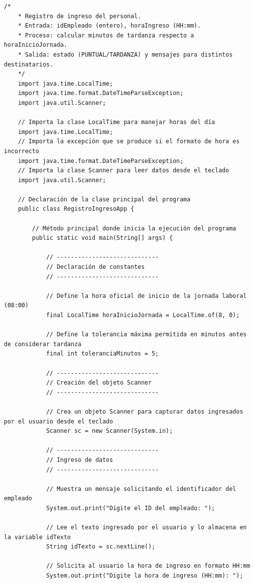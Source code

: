 \documentclass[12pt,twoside]{book}
\begin{document}
					\begin{lstlisting}[style=Java,caption={Programa Java mínimo para registrar ingreso del personal (entrada por teclado).},label={lst:RegistroIngresoJavaMin}]
	/*
	* Registro de ingreso del personal.
	* Entrada: idEmpleado (entero), horaIngreso (HH:mm).
	* Proceso: calcular minutos de tardanza respecto a horaInicioJornada.
	* Salida: estado (PUNTUAL/TARDANZA) y mensajes para distintos destinatarios.
	*/
	import java.time.LocalTime;
	import java.time.format.DateTimeParseException;
	import java.util.Scanner;
	
	// Importa la clase LocalTime para manejar horas del día
	import java.time.LocalTime;
	// Importa la excepción que se produce si el formato de hora es incorrecto
	import java.time.format.DateTimeParseException; 
	// Importa la clase Scanner para leer datos desde el teclado
	import java.util.Scanner;                       
	
	// Declaración de la clase principal del programa
	public class RegistroIngresoApp {               
		
		// Método principal donde inicia la ejecución del programa
		public static void main(String[] args) {    
			
			// -----------------------------
			// Declaración de constantes
			// -----------------------------
			
			// Define la hora oficial de inicio de la jornada laboral (08:00)
			final LocalTime horaInicioJornada = LocalTime.of(8, 0); 
			
			// Define la tolerancia máxima permitida en minutos antes de considerar tardanza
			final int toleranciaMinutos = 5;
			
			// -----------------------------
			// Creación del objeto Scanner
			// -----------------------------
			
			// Crea un objeto Scanner para capturar datos ingresados por el usuario desde el teclado
			Scanner sc = new Scanner(System.in); 
			
			// -----------------------------
			// Ingreso de datos
			// -----------------------------
			
			// Muestra un mensaje solicitando el identificador del empleado
			System.out.print("Digite el ID del empleado: "); 
			
			// Lee el texto ingresado por el usuario y lo almacena en la variable idTexto
			String idTexto = sc.nextLine();                  
			
			// Solicita al usuario la hora de ingreso en formato HH:mm
			System.out.print("Digite la hora de ingreso (HH:mm): ");
			

\end{lstlisting}
\end{document}
